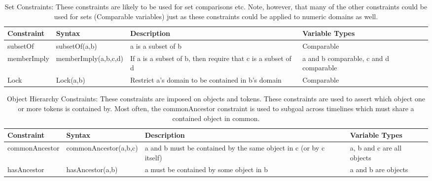 \begin{table*}[ht]
  \centering
  \renewcommand{\arraystretch}{1.0}%
  \begin{tabular}{|l|l|p{8cm}|p{3cm}|}
    \hline
    \textbf{Constraint}& \textbf{Syntax}& \textbf{Description}& \textbf{Variable Types}\\
    \hline
    subsetOf& subsetOf(a,b)& a is a subset of b& Comparable\\
    \hline
    memberImply& memberImply(a,b,c,d)& If a is a subset of b, then require that c is a subset of d& a and b comparable, c and d comparable\\
    \hline
    Lock& Lock(a,b)& Restrict a's domain to be contained in b's domain& Comparable\\
    \hline
  \end{tabular}
  \caption{\small Set Constraints: These constraints are likely to be used for set comparisons etc. Note, however, that many of the other constraints could be used for sets (\ie Comparable variables) just as these constraints could be applied to numeric domains as well.}
  \label{tab:setconst}
\end{table*}


\begin{table*}[ht]
  \centering
  \renewcommand{\arraystretch}{1.0}%
  \begin{tabular}{|l|l|p{5cm}|p{3.5cm}|}
    \hline
    \textbf{Constraint}& \textbf{Syntax}& \textbf{Description}& \textbf{Variable Types}\\
    \hline
    commonAncestor& commonAncestor(a,b,c)& a and b must be contained by the same object in c (or by c itself)& a, b and c are all objects\\
    \hline
    hasAncestor& hasAncestor(a,b)& a must be contained by some object in b& a and b are objects\\
    \hline
  \end{tabular}
  \caption{\small Object Hierarchy Constraints: These constraints are imposed on objects and tokens. These constraints are used to assert which object one or more tokens is contained by. Most often, the commonAncestor constraint is used to subgoal across timelines which must share a contained object in common.}
  \label{tab:objhierarchy}
\end{table*}


